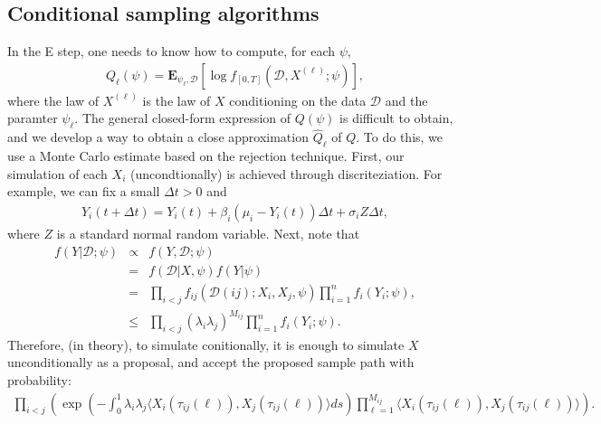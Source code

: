 \documentclass[12pt]{article}%
\begin{document}
\subsection{Conditional sampling algorithms}
In the E step, one needs to know how to compute, for each $\psi$,
\begin{eqnarray}
Q_\ell(\psi) = \mathbf E_{\psi_\ell,\mathcal D}\left[ \log f_{[0,T]}(\mathcal D, X^{(\ell)};\psi)\right],
\end{eqnarray}
where the law of $X^{(\ell)}$ is the law of $X$ conditioning on the data $\mathcal D$ and the paramter $\psi_\ell$.  
The general closed-form expression of $Q(\psi)$ is difficult to obtain, 
and we develop a way to obtain a close approximation $\widehat{Q}_\ell$ of $Q$.  
To do this, we use a Monte Carlo estimate based on the rejection technique. 
 First, our simulation of each $X_i$ (uncondtionally) is achieved through discriteziation.  
For example, we can fix a small $\Delta t > 0$ and 
\begin{eqnarray}
Y_i(t+\Delta t) = Y_i(t) + \beta_i(\mu_i - Y_i(t)) \Delta t + \sigma_i  Z \Delta t,
\end{eqnarray}
where $Z$ is a standard normal random variable.  
Next, note that 
\begin{eqnarray}
f(Y\left|\mathcal D\right.;\psi) 
&\propto& f(Y,\mathcal D;\psi) \\
&=& f(\mathcal D\left|X,\psi\right.) f(Y\left|\psi\right.)\\
&=& \prod_{i<j} f_{ij}(\mathcal D(ij);X_i,X_j,\psi) \prod_{i=1}^n f_{i}(Y_i;\psi),\\
&\le & \prod_{i<j} (\lambda_i \lambda_j)^{M_{ij}} \prod_{i=1}^n f_{i}(Y_i;\psi).
\end{eqnarray}
Therefore, (in theory), to simulate conitionally, it is enough to simulate 
$X$ unconditionally as a proposal, and accept the proposed sample path
with probability:
\begin{eqnarray}
\prod_{i<j} \left(
\exp\left(-\int_{0}^{1} \lambda_i \lambda_j \langle X_i(\tau_{ij}(\ell)),X_j(\tau_{ij}(\ell))\rangle ds\right)
\prod_{\ell=1}^{M_{ij}}\langle X_i(\tau_{ij}(\ell)),X_j(\tau_{ij}(\ell))\rangle\right)
. 
\end{eqnarray}
\end{document}
